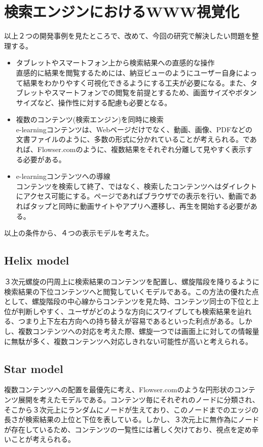 \section{検索エンジンにおけるWWW視覚化}
以上２つの開発事例を見たところで、改めて、今回の研究で解決したい問題を整理する。
\begin{itemize}
\item タブレットやスマートフォン上から検索結果への直感的な操作
\\
直感的に結果を閲覧するためには、納豆ビューのようにユーザー自身によって結果をわかりやすく可視化できるようにする工夫が必要になる。また、タブレットやスマートフォンでの閲覧を前提とするため、画面サイズやボタンサイズなど、操作性に対する配慮も必要となる。
\\
\item 複数のコンテンツ(検索エンジン)を同時に検索
\\
e-learningコンテンツは、Webページだけでなく、動画、画像、PDFなどの文書ファイルのように、多数の形式に分かれていることが考えられる。であれば、Flowser.comのように、複数結果をそれぞれ分離して見やすく表示する必要がある。
\\
\item e-learningコンテンツへの導線
\\
コンテンツを検索して終了、ではなく、検索したコンテンツへはダイレクトにアクセス可能にする。ページであればブラウザでの表示を行い、動画であればタップと同時に動画サイトやアプリへ遷移し、再生を開始する必要がある。
\end{itemize}

以上の条件から、４つの表示モデルを考えた。

\subsection{Helix model}
３次元螺旋の円周上に検索結果のコンテンツを配置し、螺旋階段を降りるように検索結果の下位コンテンツへと閲覧していくモデルである。この方法の優れた点として、螺旋階段の中心線からコンテンツを見た時、コンテンツ同士の下位と上位が判断しやすく、ユーザがどのような方向にスワイプしても検索結果を辿れる、つまり上下左右方向への持ち替えが容易であるといった利点がある。しかし、複数コンテンツへの対応を考えた際、螺旋一つでは画面上に対しての情報量に無駄が多く、複数コンテンツへ対応しきれない可能性が高いと考えられる。

\subsection{Star model}
複数コンテンツへの配置を最優先に考え、Flowser.comのような円形状のコンテンツ展開を考えたモデルである。コンテンツ毎にそれぞれのノードに分類され、そこから３次元上にランダムにノードが生えており、このノードまでのエッジの長さが検索結果の上位と下位を表している。しかし、３次元上に無作為にノードが存在しているため、コンテンツの一覧性には著しく欠けており、視点を定め辛いことが考えられる。

